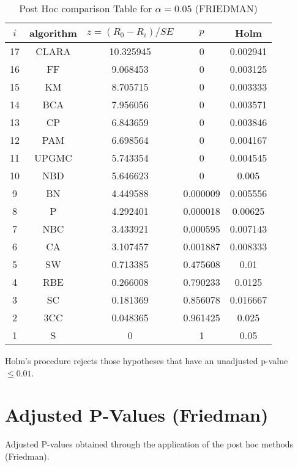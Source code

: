 \documentclass[a4paper,10pt]{article}
\begin{document}
\begin{landscape}
\begin{table}[!htp]
\centering\footnotesize
\begin{tabular}{ccccc}
$i$&algorithm&$z=(R_0 - R_i)/SE$&$p$&Holm \\
\hline17&CLARA&10.325945&0&0.002941\\16&FF&9.068453&0&0.003125\\15&KM&8.705715&0&0.003333\\14&BCA&7.956056&0&0.003571\\13&CP&6.843659&0&0.003846\\12&PAM&6.698564&0&0.004167\\11&UPGMC&5.743354&0&0.004545\\10&NBD&5.646623&0&0.005\\9&BN&4.449588&0.000009&0.005556\\8&P&4.292401&0.000018&0.00625\\7&NBC&3.433921&0.000595&0.007143\\6&CA&3.107457&0.001887&0.008333\\5&SW&0.713385&0.475608&0.01\\4&RBE&0.266008&0.790233&0.0125\\3&SC&0.181369&0.856078&0.016667\\2&3CC&0.048365&0.961425&0.025\\1&S&0&1&0.05\\\hline
\end{tabular}
\caption{Post Hoc comparison Table for $\alpha=0.05$ (FRIEDMAN)}
\end{table}Holm's procedure rejects those hypotheses that have an unadjusted p-value $\le0.01$.


\newpage

\section{Adjusted P-Values (Friedman)}


Adjusted P-values obtained through the application of the post hoc methods (Friedman).


\end{landscape}
\end{document}
